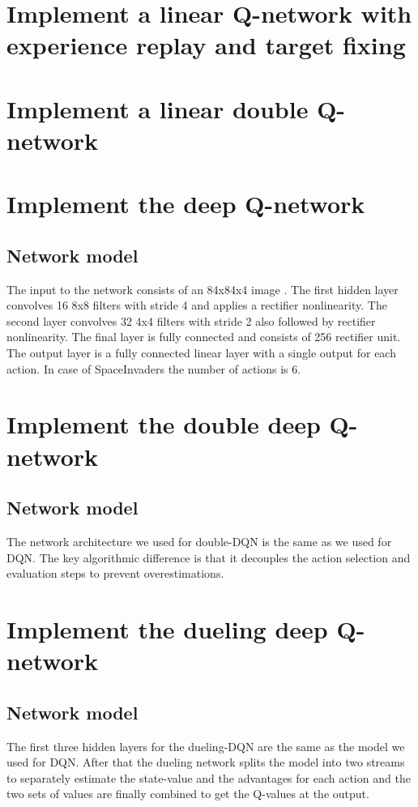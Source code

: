 \documentclass{article}
\begin{document}
\section*{Implement a linear Q-network with experience replay and target fixing}

\section*{Implement a linear double Q-network}

\section*{Implement the deep Q-network}
\subsection*{Network model}
The input to the network consists of an 84x84x4 image . The first hidden layer convolves 16 8x8 filters with stride 4 and applies a rectifier nonlinearity. The second layer convolves 32 4x4 filters with stride 2 also followed by rectifier nonlinearity. The final layer is fully connected and consists of 256 rectifier unit. The output layer is a fully connected linear layer with a single output for each action. In case of SpaceInvaders the number of actions is 6.


\section*{Implement the double deep Q-network}
\subsection*{Network model}
The network architecture we used for double-DQN is the same as we used for DQN. The key algorithmic difference is that it decouples the action selection and evaluation steps to prevent overestimations.


\section*{Implement the dueling deep Q-network}
\subsection*{Network model}
The first three hidden layers for the dueling-DQN are the same as the model we used for DQN. After that the dueling network splits the model into two streams to separately estimate the state-value and the advantages for each action and the two sets of values are finally combined to get the Q-values at the output.
\end{document}
